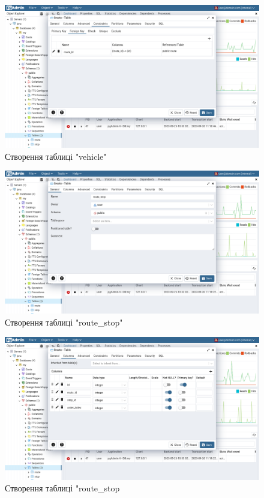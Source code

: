 \documentclass[14pt]{extreport}
\begin{document}
\begin{normalsize}
	\begin{figure}[H]
		\centering
		\includegraphics[scale=0.35]{26}
		\caption{Створення таблиці "vehicle"}
	\end{figure}
	
	\begin{figure}[H]
		\centering
		\includegraphics[scale=0.35]{27}
		\caption{Створення таблиці "route\_stop"}
	\end{figure}
	
	\begin{figure}[H]
		\centering
		\includegraphics[scale=0.35]{28}
		\caption{Створення таблиці "route\_stop}
	\end{figure}
	

\end{normalsize}
\end{document}
